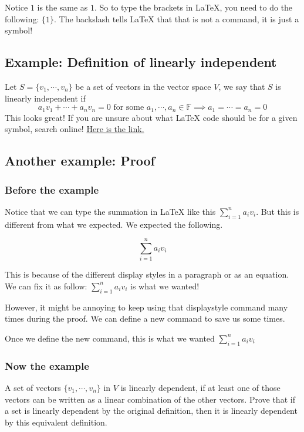 \documentclass{article}
\newcommand{\Sum}{\displaystyle\sum} %
\begin{document}
Notice ${1}$ is the same as $1$. So to type the brackets in LaTeX, you need to do the following: $\{1\}$. The backslash tells LaTeX that that is not a command, it is just a symbol!

\subsection{Example: Definition of linearly independent}

Let $S = \{ v_1, \cdots, v_n \}$ be a set of vectors in the vector space $V$, we say that $S$ is linearly independent if
$$
a_1 v_1 + \cdots + a_n v_n = 0 \text{ for some } a_1, \cdots, a_n \in \mathbb{F}
\implies
a_1 = \cdots = a_n = 0
$$
This looks great! If you are unsure about what LaTeX code should be for a given symbol, search online!
\href{https://oeis.org/wiki/List_of_LaTeX_mathematical_symbols}
{
{\color{blue}Here is the link.}
}

\subsection{Another example: Proof}
\subsubsection{Before the example}
Notice that we can type the summation in LaTeX like this $\sum_{i=1}^{n} a_i v_i$. But this is different from what we expected. We expected the following.

$$
\sum_{i=1}^{n} a_i v_i
$$

This is because of the different display styles in a paragraph or as an equation. We can fix it as follow: $\displaystyle\sum_{i=1}^{n} a_i v_i$ is what we wanted!

However, it might be annoying to keep using that displaystyle command many times during the proof. We can define a new command to save us some times.

Once we define the new command, this is what we wanted $\Sum_{i=1}^{n} a_i v_i$

\subsubsection{Now the example}
A set of vectors $\{ v_1, \cdots, v_n\}$ in $V$ is linearly dependent, if at least one of those vectors can be written as a linear combination of the other vectors. Prove that if a set is linearly dependent by the original definition, then it is linearly dependent by this equivalent definition.
\end{document}
